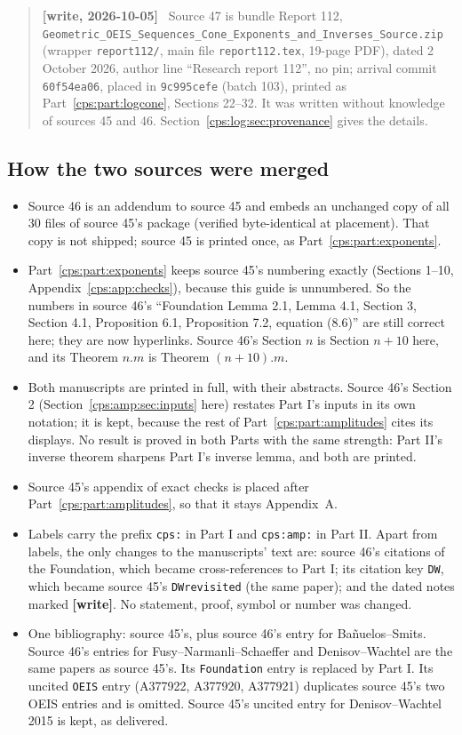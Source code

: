 \documentclass[11pt,letterpaper]{article}
\numberwithin{equation}{section}
\theoremstyle{remark}\newtheorem{remark}[theorem]{Remark}
\newenvironment{writenotelog}{\begin{quote}\small\sloppy\textbf{[write, 2026-10-05]}\ }{\end{quote}}
\begin{document}
\begin{writenotelog}
Source 47 is bundle Report 112, \texttt{Geometric\_OEIS\_\allowbreak Sequences\_Cone\_\allowbreak Exponents\_and\_\allowbreak Inverses\_Source.zip}
(wrapper \texttt{report112/}, main file \texttt{report112.tex}, 19-page PDF), dated 2 October 2026,
author line ``Research report 112'', no pin; arrival commit \texttt{60f54ea06}, placed in
\texttt{9c995cefe} (batch 103), printed as Part~\ref{cps:part:logcone}, Sections 22--32. It was
written without knowledge of sources 45 and 46. Section~\ref{cps:log:sec:provenance} gives the
details.
\end{writenotelog}

\subsection*{How the two sources were merged}
\begin{itemize}
\item Source 46 is an addendum to source 45 and embeds an unchanged copy of all 30 files of
 source 45's package (verified byte-identical at placement). That copy is not shipped; source 45
 is printed once, as Part~\ref{cps:part:exponents}.
\item Part~\ref{cps:part:exponents} keeps source 45's numbering exactly (Sections 1--10,
 Appendix~\ref{cps:app:checks}), because this guide is unnumbered. So the numbers in source 46's
 ``Foundation Lemma 2.1, Lemma 4.1, Section 3, Section 4.1, Proposition 6.1, Proposition 7.2,
 equation (8.6)'' are still correct here; they are now hyperlinks. Source 46's Section $n$ is
 Section $n+10$ here, and its Theorem $n.m$ is Theorem $(n+10).m$.
\item Both manuscripts are printed in full, with their abstracts. Source 46's Section 2
 (Section~\ref{cps:amp:sec:inputs} here) restates Part I's inputs in its own notation; it is
 kept, because the rest of Part~\ref{cps:part:amplitudes} cites its displays. No result is proved
 in both Parts with the same strength: Part II's inverse theorem sharpens Part I's inverse lemma,
 and both are printed.
\item Source 45's appendix of exact checks is placed after Part~\ref{cps:part:amplitudes}, so that
 it stays Appendix~A.
\item Labels carry the prefix \texttt{cps:} in Part I and \texttt{cps:amp:} in Part II. Apart from
 labels, the only changes to the manuscripts' text are: source 46's citations of the
 Foundation, which became cross-references to Part I; its citation key \texttt{DW}, which became
 source 45's \texttt{DWrevisited} (the same paper); and the dated notes marked \textbf{[write]}.
 No statement, proof, symbol or number was changed.
\item One bibliography: source 45's, plus source 46's entry for Ba\~nuelos--Smits. Source 46's
 entries for Fusy--Narmanli--Schaeffer and Denisov--Wachtel are the same papers as source 45's.
 Its \texttt{Foundation} entry is replaced by Part I. Its uncited \texttt{OEIS} entry (A377922,
 A377920, A377921) duplicates source 45's two OEIS entries and is omitted. Source 45's uncited
 entry for Denisov--Wachtel 2015 is kept, as delivered.
\end{itemize}
\end{document}
